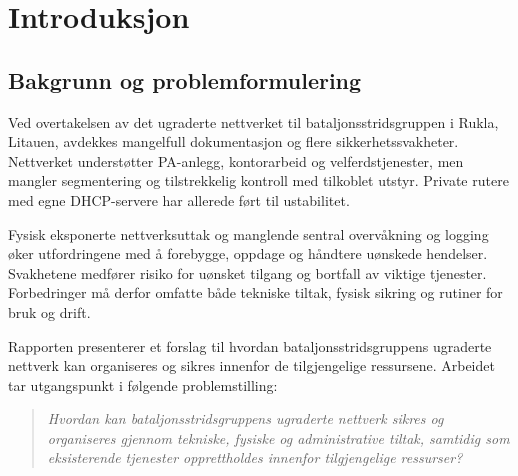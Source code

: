 \section{Introduksjon}

\setlength{\parindent}{0pt}
\setlength{\parskip}{0.8em}
\subsection{Bakgrunn og problemformulering}

Ved overtakelsen av det ugraderte nettverket til
bataljonsstridsgruppen i Rukla, Litauen, avdekkes
mangelfull dokumentasjon og flere sikkerhetssvakheter.
Nettverket understøtter PA-anlegg,
kontorarbeid og velferdstjenester, men mangler
segmentering og tilstrekkelig kontroll med tilkoblet
utstyr. Private rutere med egne DHCP-servere har
allerede ført til ustabilitet.

Fysisk eksponerte nettverksuttak og manglende sentral
overvåkning og logging øker utfordringene med å
forebygge, oppdage og håndtere uønskede hendelser.
Svakhetene medfører risiko for uønsket tilgang og
bortfall av viktige tjenester. Forbedringer må derfor
omfatte både tekniske tiltak, fysisk sikring og
rutiner for bruk og drift.

Rapporten presenterer et forslag til hvordan bataljonsstridsgruppens ugraderte nettverk kan organiseres og sikres innenfor de tilgjengelige ressursene. Arbeidet tar utgangspunkt i følgende problemstilling:

\begin{quote}
    \emph{Hvordan kan bataljonsstridsgruppens ugraderte
    nettverk sikres og organiseres gjennom tekniske,
    fysiske og administrative tiltak, samtidig som
    eksisterende tjenester opprettholdes innenfor
    tilgjengelige ressurser?}
\end{quote}